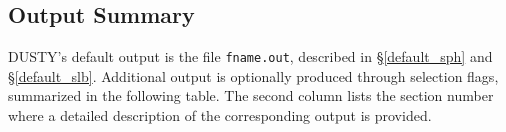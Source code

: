 \documentclass[11pt]{article}
\def\D  {{\sf DUSTY}}
\begin{document}
\newpage

\begin{appendix}


\section{Output Summary}
\label{summary}

\D's default output is the file {\tt fname.out}, described in \S\ref{default_sph}
and \S\ref{default_slb}.
Additional output is optionally produced through selection flags, summarized in
the following table.  The second column lists the section number where a
detailed description of the corresponding output is provided.

\begin{table}[htbp]
\begin{center}
\renewcommand{\arraystretch}{1.3}


\end{center}
\end{table}
\end{appendix}
\end{document}
